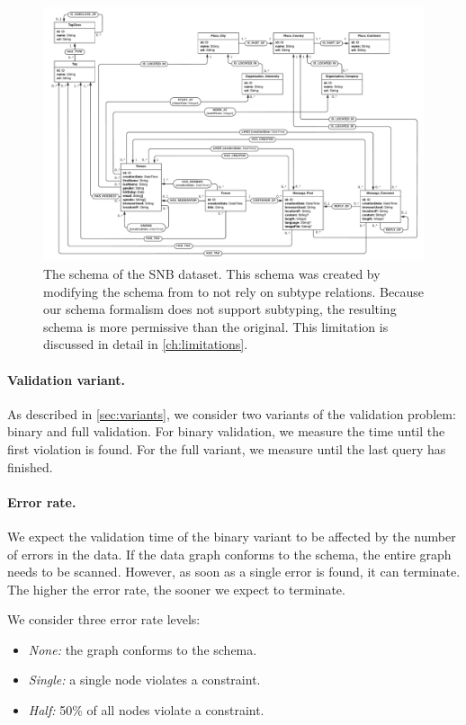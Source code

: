 \documentclass{report}
\theoremstyle{definition}
\begin{document}
\begin{figure}[t]
  \centering
  \includegraphics[width=\textwidth]{figures/schema-snb.pdf}
  \caption[The schema of the SNB dataset]{The schema of the SNB dataset. This schema was created by modifying the schema from \citet{angles2020snb} to not rely on subtype relations. Because our schema formalism does not support subtyping, the resulting schema is more permissive than the original. This limitation is discussed in detail in \autoref{ch:limitations}.}
  \label{fig:schema-snb}
\end{figure}

\paragraph{Validation variant.} As described in \autoref{sec:variants}, we consider two variants of the validation problem: binary and full validation. For binary validation, we measure the time until the first violation is found. For the full variant, we measure until the last query has finished.

\paragraph{Error rate.} We expect the validation time of the binary variant to be affected by the number of errors in the data. If the data graph conforms to the schema, the entire graph needs to be scanned. However, as soon as a single error is found, it can terminate. The higher the error rate, the sooner we expect to terminate.

We consider three error rate levels:

\begin{itemize}
  \item \emph{None:} the graph conforms to the schema.
  \item \emph{Single:} a single node violates a constraint.
  \item \emph{Half:} 50\% of all nodes violate a constraint.
\end{itemize}
\end{document}
